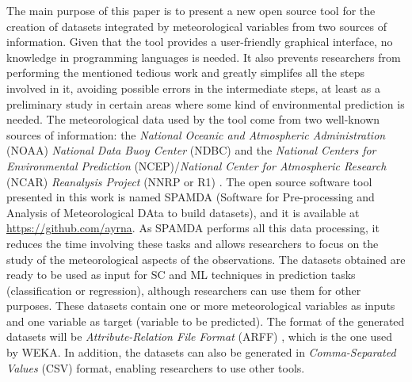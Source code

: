 \documentclass[energies,article,accept,moreauthors,pdftex]{Definitions/mdpi}
\begin{document}
		The main purpose of this paper is to present a new open source tool for the creation of datasets integrated by meteorological variables from two sources of information. Given that the tool provides a user-friendly graphical interface, no knowledge in programming languages is needed. It also prevents researchers from performing the mentioned tedious work and greatly simplifes all the steps involved in it, avoiding possible errors in the intermediate steps, at least as a preliminary study in certain areas where some kind of environmental prediction is needed. The meteorological data used by the tool come from two well-known sources of information: the \textit{National Oceanic and Atmospheric Administration} (NOAA) \textit{National Data Buoy Center} (NDBC) \cite{NOAA} and the \textit{National Centers for Environmental Prediction} (NCEP)/\textit{National Center for Atmospheric Research} (NCAR) \textit{Reanalysis Project} (NNRP or R1) \cite{Kalnay1996, Kistler2001}. The open source software tool presented in this work is named SPAMDA (Software for Pre-processing and Analysis of Meteorological DAta to build datasets), and it is available at \url{https://github.com/ayrna}. As SPAMDA performs all this data processing, it reduces the time involving these tasks and allows researchers to focus on the study of the meteorological aspects of the observations. The datasets obtained are ready to be used as input for SC and ML techniques in prediction tasks (classification or regression), although researchers can use them for other purposes. These datasets contain one or more meteorological variables as inputs and one variable as target (variable to be predicted). The format of the generated datasets will be \textit{Attribute-Relation File Format} (ARFF) \cite{WEKA_ARFF}, which is the one used by WEKA. In addition, the datasets can also be generated in \textit{Comma-Separated Values} (CSV) format, enabling researchers to use other tools.
		
\end{document}
